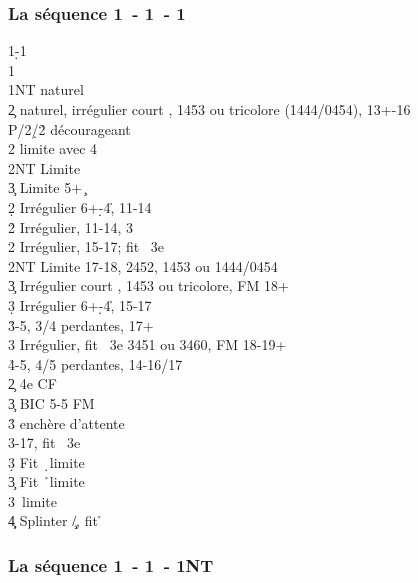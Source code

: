 \documentclass[a4paper]{article}
\begin{document}
\subsubsection{La séquence 1\pdfd\ - 1\pdfh\ - 1\pdfs}

\begin{bidtable}
1\d-1\h\\
1\s\+\\
1NT \> naturel\+\\
2\c \> naturel, irrégulier court \s , 1453 ou tricolore (1444/0454), 13+-16\+\\
P/2\d/2\h \> décourageant\\
2\s \> limite avec 4\c \\
2NT \> Limite\\
3\c \> Limite 5+ \c \-\\
2\d \> Irrégulier 6+\d -4\h , 11-14\\
2\h \> Irrégulier, 11-14, 3\s \\
2\s \> Irrégulier, 15-17; fit \s\ 3e\\
2NT \> Limite 17-18, 2452, 1453 ou 1444/0454\\
3\c \> Irrégulier court \s , 1453 ou tricolore, FM 18+\\
3\d \> Irrégulier 6+\d -4\h , 15-17\\
3\h {}-5, 3/4 perdantes, 17+\\
3\s \> Irrégulier, fit \s\ 3e 3451 ou 3460, FM 18-19+\\
4\h {}-5, 4/5 perdantes, 14-16/17\-\\
2\c \> 4e CF\\
3\c \> BIC 5-5 FM\+\\
3\h \> enchère d'attente\\
3\s {}-17, fit \s\ 3e\-\\
3\d \> Fit \d\ limite\\
3\c \> Fit \h\ limite\\
3\s {}\s\ limite\\
4\c\d \> Splinter \c /\d , fit \h \-
\end{bidtable}

\subsubsection{La séquence 1\pdfd\ - 1\pdfh\ - 1NT}
\end{document}
